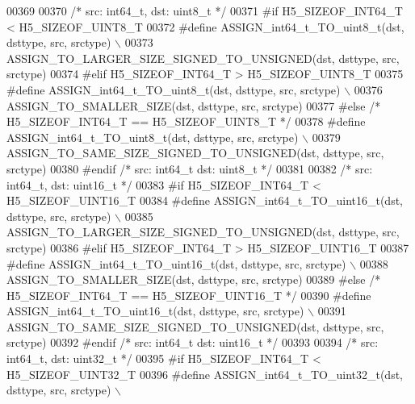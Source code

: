 \begin{DoxyCode}
00369 
00370 \textcolor{comment}{/* src: int64\_t, dst: uint8\_t */}
00371 \textcolor{preprocessor}{#if H5\_SIZEOF\_INT64\_T < H5\_SIZEOF\_UINT8\_T}
00372 \textcolor{preprocessor}{    #define ASSIGN\_int64\_t\_TO\_uint8\_t(dst, dsttype, src, srctype) \(\backslash\)}
00373 \textcolor{preprocessor}{        ASSIGN\_TO\_LARGER\_SIZE\_SIGNED\_TO\_UNSIGNED(dst, dsttype, src, srctype)}
00374 \textcolor{preprocessor}{#elif H5\_SIZEOF\_INT64\_T > H5\_SIZEOF\_UINT8\_T}
00375 \textcolor{preprocessor}{    #define ASSIGN\_int64\_t\_TO\_uint8\_t(dst, dsttype, src, srctype) \(\backslash\)}
00376 \textcolor{preprocessor}{        ASSIGN\_TO\_SMALLER\_SIZE(dst, dsttype, src, srctype)}
00377 \textcolor{preprocessor}{#else }\textcolor{comment}{/* H5\_SIZEOF\_INT64\_T == H5\_SIZEOF\_UINT8\_T */}\textcolor{preprocessor}{}
00378 \textcolor{preprocessor}{    #define ASSIGN\_int64\_t\_TO\_uint8\_t(dst, dsttype, src, srctype) \(\backslash\)}
00379 \textcolor{preprocessor}{        ASSIGN\_TO\_SAME\_SIZE\_SIGNED\_TO\_UNSIGNED(dst, dsttype, src, srctype)}
00380 \textcolor{preprocessor}{#endif }\textcolor{comment}{/* src: int64\_t dst: uint8\_t */}\textcolor{preprocessor}{}
00381 
00382 \textcolor{comment}{/* src: int64\_t, dst: uint16\_t */}
00383 \textcolor{preprocessor}{#if H5\_SIZEOF\_INT64\_T < H5\_SIZEOF\_UINT16\_T}
00384 \textcolor{preprocessor}{    #define ASSIGN\_int64\_t\_TO\_uint16\_t(dst, dsttype, src, srctype) \(\backslash\)}
00385 \textcolor{preprocessor}{        ASSIGN\_TO\_LARGER\_SIZE\_SIGNED\_TO\_UNSIGNED(dst, dsttype, src, srctype)}
00386 \textcolor{preprocessor}{#elif H5\_SIZEOF\_INT64\_T > H5\_SIZEOF\_UINT16\_T}
00387 \textcolor{preprocessor}{    #define ASSIGN\_int64\_t\_TO\_uint16\_t(dst, dsttype, src, srctype) \(\backslash\)}
00388 \textcolor{preprocessor}{        ASSIGN\_TO\_SMALLER\_SIZE(dst, dsttype, src, srctype)}
00389 \textcolor{preprocessor}{#else }\textcolor{comment}{/* H5\_SIZEOF\_INT64\_T == H5\_SIZEOF\_UINT16\_T */}\textcolor{preprocessor}{}
00390 \textcolor{preprocessor}{    #define ASSIGN\_int64\_t\_TO\_uint16\_t(dst, dsttype, src, srctype) \(\backslash\)}
00391 \textcolor{preprocessor}{        ASSIGN\_TO\_SAME\_SIZE\_SIGNED\_TO\_UNSIGNED(dst, dsttype, src, srctype)}
00392 \textcolor{preprocessor}{#endif }\textcolor{comment}{/* src: int64\_t dst: uint16\_t */}\textcolor{preprocessor}{}
00393 
00394 \textcolor{comment}{/* src: int64\_t, dst: uint32\_t */}
00395 \textcolor{preprocessor}{#if H5\_SIZEOF\_INT64\_T < H5\_SIZEOF\_UINT32\_T}
00396 \textcolor{preprocessor}{    #define ASSIGN\_int64\_t\_TO\_uint32\_t(dst, dsttype, src, srctype) \(\backslash\)}

\end{DoxyCode}
